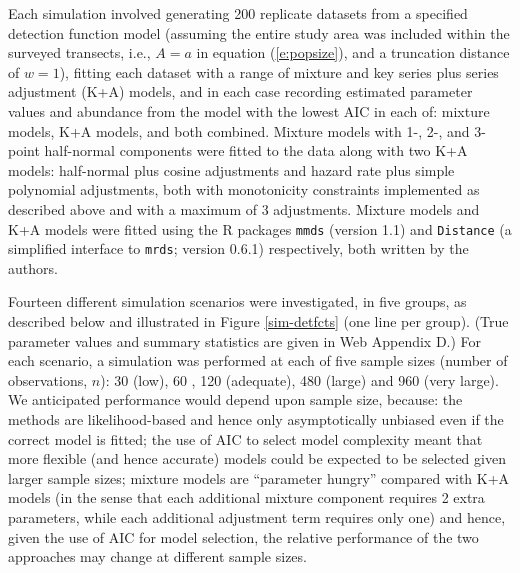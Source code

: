 \documentclass[useAMS,referee,usenatbib]{biom}
\begin{document}
Each simulation involved generating 200 replicate datasets from a specified detection function model (assuming the entire study area was included within the surveyed transects, i.e., $A=a$ in equation (\ref{e:popsize}), and a truncation distance of $w=1$), fitting each dataset with a range of mixture and key series plus series adjustment (K+A) models, and in each case recording estimated parameter values and abundance from the model with the lowest AIC in each of: mixture models, K+A models, and both combined.  Mixture models with 1-, 2-, and 3-point half-normal components were fitted to the data along with two K+A models: half-normal plus cosine adjustments and hazard rate plus simple polynomial adjustments, both with monotonicity constraints implemented as described above and with a maximum of 3 adjustments. Mixture models and K+A models were fitted using the R packages \texttt{mmds} (version 1.1) and \texttt{Distance} (a simplified interface to \texttt{mrds}; version 0.6.1) respectively, both written by the authors.

Fourteen different simulation scenarios were investigated, in five groups, as described below and illustrated in Figure \ref{sim-detfcts} (one line per group). (True parameter values and summary statistics are given in Web Appendix D.)  For each scenario, a simulation was performed at each of five sample sizes (number of observations, $n$): 30 (low), 60 \citep[recommended minimum for line transects;][]{Buckland:2001vm}, 120 (adequate), 480 (large) and 960 (very large).  We anticipated performance would depend upon sample size, because: the methods are likelihood-based and hence only asymptotically unbiased even if the correct model is fitted; the use of AIC to select model complexity meant that more flexible (and hence accurate) models could be expected to be selected given larger sample sizes; mixture models are ``parameter hungry'' compared with K+A models (in the sense that each additional mixture component requires 2 extra parameters, while each additional adjustment term requires only one) and hence, given the use of AIC for model selection, the relative performance of the two approaches may change at different sample sizes. 
\end{document}
